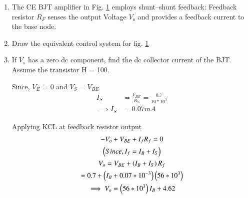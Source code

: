\begin{enumerate}[label=\thesection.\arabic*.,ref=\thesection.\theenumi]

\item The CE BJT amplifier in Fig. \ref{fig:Original ckt} employs shunt–shunt feedback: Feedback resistor $R_{F}$ senses the output Voltage $V_{o}$ and provides a feedback current to the base node.

 \begin{figure}[!ht]
 	\begin{center}
 			\resizebox{\columnwidth}{!}{}
 	\end{center}
 \caption{}
 \label{fig:Original ckt}
 \end{figure}
 
\item Draw the equivalent control system for fig. \ref{fig:Original ckt} 
\solution

 \begin{figure}[!ht]
 	\begin{center}
 			\resizebox{\columnwidth}{!}{}
 	\end{center}
 \caption{}
 \label{fig: cs blk}
 \end{figure}
 
\item If $V_{s}$ has a zero dc component, find the dc collector current of the BJT. Assume the transistor H = 100.

 \solution 
 Since, $V_{E}$ = 0 and $V_{S}$ = $V_{BE}$
 \begin{align}
    I_{S} &= \frac{V_{BE}}{R_{S}}
     = \frac{0.7}{10 * 10^3}\\
    \implies I_{S} &= 0.07 mA
 \end{align}
 
 Applying KCL at feedback resistor output
\begin{multline}
    -V_{o} + V_{BE} + I_{f}R_{f} = 0\\
    \text{\brak{Since, I_{f} = I_{B} + I_{S}}}\\
    V_{o} = V_{BE} + \brak{I_{B} + I_{S}}R_{f}  \\
     = 0.7 + \brak{I_{B} + 0.07*10^{-3}}\brak{56*10^3}\\
    \implies V_{o}= \brak{56*10^3}I_{B} + 4.62
     \label{eq:ee17btech11031_fed1}
\end{multline}


\end{enumerate}
